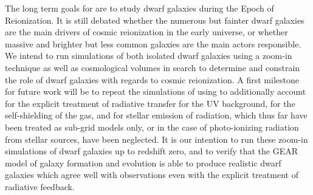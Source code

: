 The long term goals for \GEARRT are to study dwarf galaxies during the Epoch of Reionization. It is
still debated whether the numerous but fainter dwarf galaxies are the main drivers of cosmic
reionization in the early universe, or whether massive and brighter but less common galaxies are the
main actors responsible. We intend to run simulations of both isolated dwarf galaxies using a
zoom-in technique as well as cosmological volumes in search to determine and constrain the role of
dwarf galaxies with regards to cosmic reionization. A first milestone for future work will be to
repeat the simulations of \citet{revazPushingBackLimits2018} using \GEARRT to additionally account
for the explicit treatment of radiative transfer for the UV background, for the self-shielding of
the gas, and for stellar emission of radiation, which thus far have been treated as sub-grid models only, or in the case of photo-ionizing radiation from stellar sources, have been neglected. It is our intention to run these zoom-in simulations of dwarf galaxies up to redshift zero, and to verify that the GEAR model of galaxy formation and evolution is able to produce realistic dwarf galaxies which agree well with observations even with the explicit treatment of radiative feedback.






